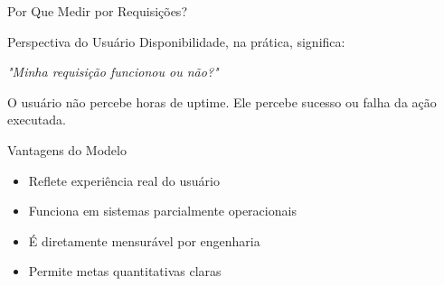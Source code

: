 \documentclass[9pt]{beamer}
\begin{document}
\begin{frame}{Por Que Medir por Requisições?}

\begin{block}{Perspectiva do Usuário}
Disponibilidade, na prática, significa:

\begin{center}
\textit{"Minha requisição funcionou ou não?"}
\end{center}

O usuário não percebe horas de uptime.
Ele percebe sucesso ou falha da ação executada.
\end{block}

\begin{block}{Vantagens do Modelo}
\begin{itemize}
    \item Reflete experiência real do usuário
    \item Funciona em sistemas parcialmente operacionais
    \item É diretamente mensurável por engenharia
    \item Permite metas quantitativas claras
\end{itemize}
\end{block}

\begin{center}
\end{center}

\end{frame}
\end{document}
